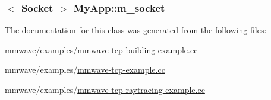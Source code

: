 \subsubsection[{\texorpdfstring{m\+\_\+socket}{m_socket}}]{$<$ {\bf Socket} $>$ My\+App\+::m\+\_\+socket\hspace{0.3cm}{\ttfamily [private]}}\hypertarget{classMyApp_a6393c163d35660b22b57b61b61d109a4}{}\label{classMyApp_a6393c163d35660b22b57b61b61d109a4}


The documentation for this class was generated from the following files\+:\begin{DoxyCompactItemize}
\item 
mmwave/examples/\hyperlink{mmwave-tcp-building-example_8cc}{mmwave-\/tcp-\/building-\/example.\+cc}\item 
mmwave/examples/\hyperlink{mmwave-tcp-example_8cc}{mmwave-\/tcp-\/example.\+cc}\item 
mmwave/examples/\hyperlink{mmwave-tcp-raytracing-example_8cc}{mmwave-\/tcp-\/raytracing-\/example.\+cc}\end{DoxyCompactItemize}
